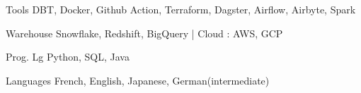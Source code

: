 

\begin{cvskills}



  \cvskill
    {Tools} %
    {DBT, Docker, Github Action, Terraform, Dagster, Airflow, Airbyte, Spark } %
  
  \cvskill
    {Warehouse} %
    {Snowflake, Redshift, BigQuery | Cloud : AWS, GCP} %

  \cvskill
    {Prog. Lg} %
    {Python, SQL, Java} %

  \cvskill
    {Languages} %
    {French, English, Japanese, German(intermediate)} %

\end{cvskills}
